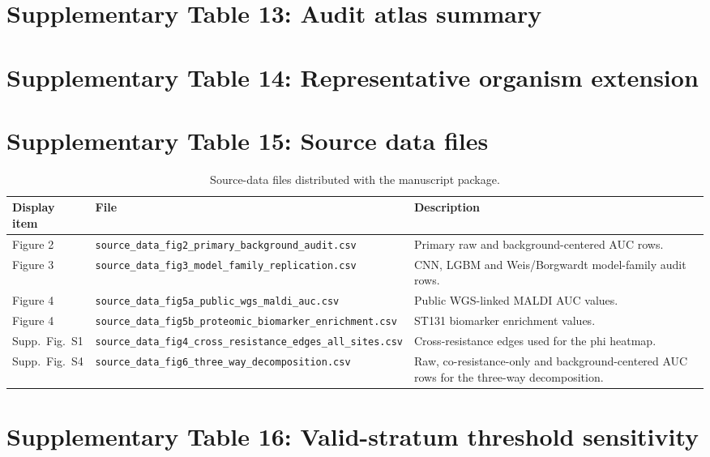 \documentclass[11pt]{article}
\begin{document}


\section*{Supplementary Table 13: Audit atlas summary}



\section*{Supplementary Table 14: Representative organism extension}



\section*{Supplementary Table 15: Source data files}

\begin{table}[ht]
\centering
\small
\caption{Source-data files distributed with the manuscript package.}
\begin{tabular}{lll}
\toprule
Display item & File & Description \\
\midrule
Figure 2 & \texttt{source\_data\_fig2\_primary\_background\_audit.csv} & Primary raw and background-centered AUC rows. \\
Figure 3 & \texttt{source\_data\_fig3\_model\_family\_replication.csv} & CNN, LGBM and Weis/Borgwardt model-family audit rows. \\
Figure 4 & \texttt{source\_data\_fig5a\_public\_wgs\_maldi\_auc.csv} & Public WGS-linked MALDI AUC values. \\
Figure 4 & \texttt{source\_data\_fig5b\_proteomic\_biomarker\_enrichment.csv} & ST131 biomarker enrichment values. \\
Supp.\ Fig.\ S1 & \texttt{source\_data\_fig4\_cross\_resistance\_edges\_all\_sites.csv} & Cross-resistance edges used for the phi heatmap. \\
Supp.\ Fig.\ S4 & \texttt{source\_data\_fig6\_three\_way\_decomposition.csv} & Raw, co-resistance-only and background-centered AUC rows for the three-way decomposition. \\
\bottomrule
\end{tabular}
\end{table}

\section*{Supplementary Table 16: Valid-stratum threshold sensitivity}
\end{document}
